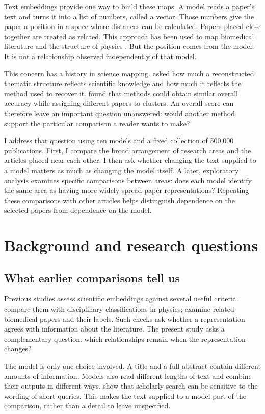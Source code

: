 \documentclass[12pt]{article}
\begin{document}
Text embeddings provide one way to build these maps. A model reads a paper's text and turns it into a list of numbers, called a vector. Those numbers give the paper a position in a space where distances can be calculated. Papers placed close together are treated as related. This approach has been used to map biomedical literature and the structure of physics \citep{refbe130e2973,refc0e2cc29e0}. But the position comes from the model. It is not a relationship observed independently of that model.

This concern has a history in science mapping. \citet{refa0d2d707e6} asked how much a reconstructed thematic structure reflects scientific knowledge and how much it reflects the method used to recover it. \citet{ref6a2f5912bc} found that methods could obtain similar overall accuracy while assigning different papers to clusters. An overall score can therefore leave an important question unanswered: would another method support the particular comparison a reader wants to make?

I address that question using ten models and a fixed collection of 500,000 publications. First, I compare the broad arrangement of research areas and the articles placed near each other. I then ask whether changing the text supplied to a model matters as much as changing the model itself. A later, exploratory analysis examines specific comparisons between areas: does each model identify the same area as having more widely spread paper representations? Repeating these comparisons with other articles helps distinguish dependence on the selected papers from dependence on the model.

\section{Background and research questions}
\subsection{What earlier comparisons tell us}
Previous studies assess scientific embeddings against several useful criteria. \citet{refc0e2cc29e0} compare them with disciplinary classifications in physics; \citet{refbe130e2973} examine related biomedical papers and their labels. Such checks ask whether a representation agrees with information about the literature. The present study asks a complementary question: which relationships remain when the representation changes?

The model is only one choice involved. A title and a full abstract contain different amounts of information. Models also read different lengths of text and combine their outputs in different ways. \citet{singh-singh-2022-inefficiency} show that scholarly search can be sensitive to the wording of short queries. This makes the text supplied to a model part of the comparison, rather than a detail to leave unspecified.
\end{document}
